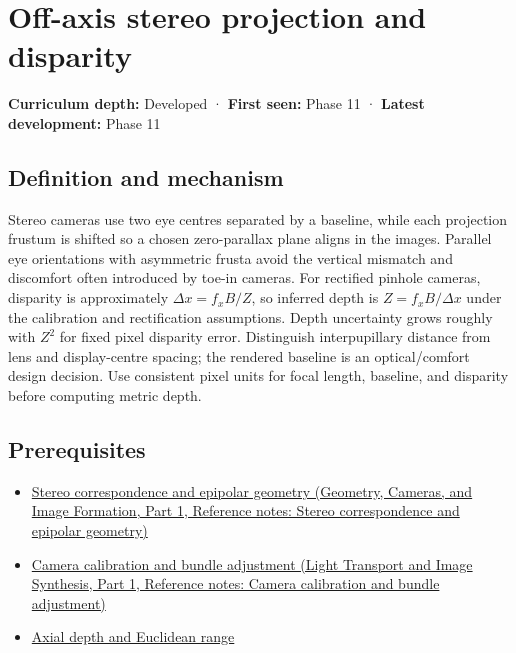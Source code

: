 \hypertarget{appendix-0976e86e5b9f}{}\label{referencestart:appendix-0976e86e5b9f}
\section{Off-axis stereo projection and disparity}\label{appendix-0976e86e5b9f-off-axis-stereo-projection-and-disparity}

\hypertarget{appendix-0976e86e5b9f-off-axis-stereo-projection-and-disparity}{}

\textbf{Curriculum depth:} Developed · \textbf{First seen:} Phase 11 · \textbf{Latest development:} Phase 11

\begin{allmightroledefinition}

\subsection{Definition and mechanism}\label{appendix-0976e86e5b9f-definition-and-mechanism}

\hypertarget{appendix-0976e86e5b9f-definition-and-mechanism}{}

Stereo cameras use two eye centres separated by a baseline, while each projection frustum is shifted so a chosen zero-parallax plane aligns in the images. Parallel eye orientations with asymmetric frusta avoid the vertical mismatch and discomfort often introduced by toe-in cameras. For rectified pinhole cameras, disparity is approximately \(\Delta x=f_xB/Z\), so inferred depth is \(Z=f_xB/\Delta x\) under the calibration and rectification assumptions. Depth uncertainty grows roughly with \(Z^2\) for fixed pixel disparity error. Distinguish interpupillary distance from lens and display-centre spacing; the rendered baseline is an optical/comfort design decision. Use consistent pixel units for focal length, baseline, and disparity before computing metric depth.

\end{allmightroledefinition}

\subsection{Prerequisites}\label{appendix-0976e86e5b9f-prerequisites}

\hypertarget{appendix-0976e86e5b9f-prerequisites}{}

\begin{itemize}
\tightlist
\item
  \href{../03-Geometry-Cameras-and-Image-Formation-P01/main.pdf\#nameddest=appendix-c4e98b6e4001}{Stereo correspondence and epipolar geometry (Geometry, Cameras, and Image Formation, Part 1, Reference notes: Stereo correspondence and epipolar geometry)}
\item
  \href{../04-Light-Transport-and-Image-Synthesis-P01/main.pdf\#nameddest=appendix-3ee9861904d5}{Camera calibration and bundle adjustment (Light Transport and Image Synthesis, Part 1, Reference notes: Camera calibration and bundle adjustment)}
\item
  \hyperref[appendix-cac01ebeeb11]{Axial depth and Euclidean range}
\end{itemize}

